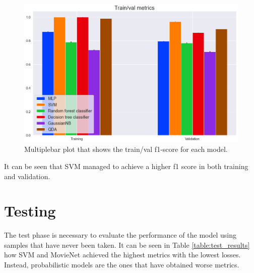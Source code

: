 \documentclass[../main]{subfiles}
\begin{document}
\begin{figure}[!ht]
    \center
    \includegraphics[width=0.8\linewidth]{figures/train_val_plot.png}
    \caption{Multiplebar plot that shows the train/val f1-score for each model.}
    \label{fig:train_val_plot}
\end{figure}
\newpage

It can be seen that SVM managed to achieve a higher f1 score in both training and validation.

\section{Testing}
The test phase is necessary to evaluate the performance of the model using samples that have never been taken.
It can be seen in Table \ref{table:test_results} how SVM and MovieNet achieved the highest metrics with the lowest losses.
Instead, probabilistic models are the ones that have obtained worse metrics.
\end{document}
